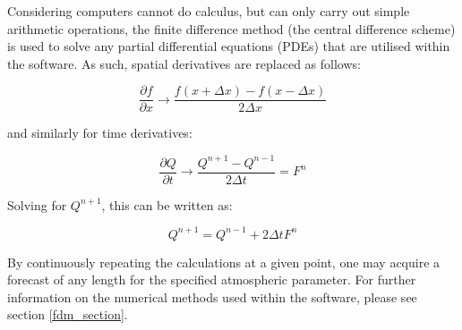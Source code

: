 \begin{center}
\end{center}

Considering computers cannot do calculus, but can only carry out simple arithmetic operations, the finite difference method (the central difference scheme) is used to solve any partial differential equations (PDEs) that are utilised within the software. As such, spatial derivatives are replaced as follows:

\begin{equation}
    \frac{\partial f}{\partial x} \rightarrow \frac{f(x + \Delta x) - f(x - \Delta x)}{2 \Delta x}
\end{equation}

and similarly for time derivatives: 

\begin{equation}
    \frac{\partial Q}{\partial t} \rightarrow \frac{Q^{n+1} - Q^{n-1}}{2 \Delta t} = F^{n}
\end{equation}

Solving for $Q^{n+1}$, this can be written as:

\begin{equation}
    Q^{n+1} = Q^{n-1} + 2 \Delta t F^{n}
\end{equation}

By continuously repeating the calculations at a given point, one may acquire a forecast of any length for the specified atmospheric parameter\cite{nwp}. For further information on the numerical methods used within the software, please see section \ref{fdm_section}.

